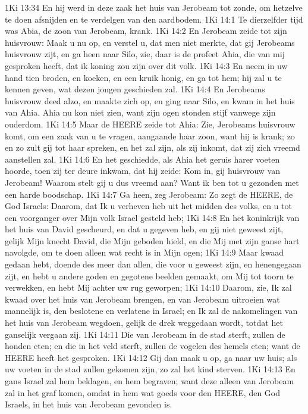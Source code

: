 1Ki 13:34  En hij werd in deze zaak het huis van Jerobeam tot zonde, om hetzelve te doen afsnijden en te verdelgen van den aardbodem.
1Ki 14:1  Te dierzelfder tijd was Abia, de zoon van Jerobeam, krank.
1Ki 14:2  En Jerobeam zeide tot zijn huisvrouw: Maak u nu op, en verstel u, dat men niet merkte, dat gij Jerobeams huisvrouw zijt, en ga heen naar Silo, zie, daar is de profeet Ahia, die van mij gesproken heeft, dat ik koning zou zijn over dit volk.
1Ki 14:3  En neem in uw hand tien broden, en koeken, en een kruik honig, en ga tot hem; hij zal u te kennen geven, wat dezen jongen geschieden zal.
1Ki 14:4  En Jerobeams huisvrouw deed alzo, en maakte zich op, en ging naar Silo, en kwam in het huis van Ahia. Ahia nu kon niet zien, want zijn ogen stonden stijf vanwege zijn ouderdom.
1Ki 14:5  Maar de HEERE zeide tot Ahia: Zie, Jerobeams huisvrouw komt, om een zaak van u te vragen, aangaande haar zoon, want hij is krank; zo en zo zult gij tot haar spreken, en het zal zijn, als zij inkomt, dat zij zich vreemd aanstellen zal.
1Ki 14:6  En het geschiedde, als Ahia het geruis harer voeten hoorde, toen zij ter deure inkwam, dat hij zeide: Kom in, gij huisvrouw van Jerobeam! Waarom stelt gij u dus vreemd aan? Want ik ben tot u gezonden met een harde boodschap.
1Ki 14:7  Ga heen, zeg Jerobeam: Zo zegt de HEERE, de God Israels: Daarom, dat Ik u verheven heb uit het midden des volks, en u tot een voorganger over Mijn volk Israel gesteld heb;
1Ki 14:8  En het koninkrijk van het huis van David gescheurd, en dat u gegeven heb, en gij niet geweest zijt, gelijk Mijn knecht David, die Mijn geboden hield, en die Mij met zijn ganse hart navolgde, om te doen alleen wat recht is in Mijn ogen;
1Ki 14:9  Maar kwaad gedaan hebt, doende des meer dan allen, die voor u geweest zijn, en henengegaan zijt, en hebt u andere goden en gegotene beelden gemaakt, om Mij tot toorn te verwekken, en hebt Mij achter uw rug geworpen;
1Ki 14:10  Daarom, zie, Ik zal kwaad over het huis van Jerobeam brengen, en van Jerobeam uitroeien wat mannelijk is, den beslotene en verlatene in Israel; en Ik zal de nakomelingen van het huis van Jerobeam wegdoen, gelijk de drek weggedaan wordt, totdat het ganselijk vergaan zij.
1Ki 14:11  Die van Jerobeam in de stad sterft, zullen de honden eten; en die in het veld sterft, zullen de vogelen des hemels eten; want de HEERE heeft het gesproken.
1Ki 14:12  Gij dan maak u op, ga naar uw huis; als uw voeten in de stad zullen gekomen zijn, zo zal het kind sterven.
1Ki 14:13  En gans Israel zal hem beklagen, en hem begraven; want deze alleen van Jerobeam zal in het graf komen, omdat in hem wat goeds voor den HEERE, den God Israels, in het huis van Jerobeam gevonden is.
